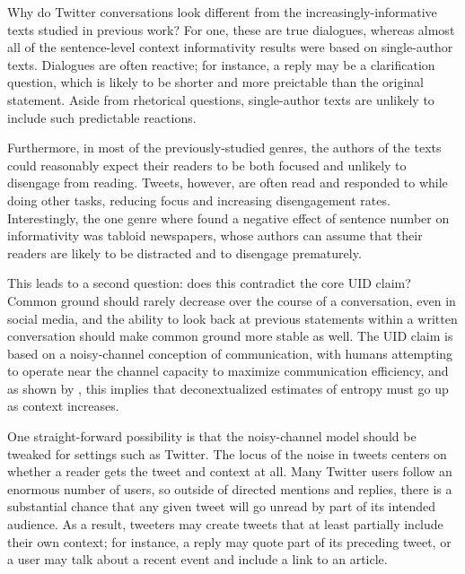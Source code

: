 \documentclass[11pt,letterpaper]{article}
\begin{document}
Why do Twitter conversations look different from the increasingly-informative texts studied in previous work? For one, these are true dialogues, whereas almost all of the sentence-level context informativity results were based on single-author texts.  Dialogues are often reactive; for instance, a reply may be a clarification question, which is likely to be shorter and more preictable than the original statement. Aside from rhetorical questions, single-author texts are unlikely to include such predictable reactions.

Furthermore, in most of the previously-studied genres, the authors of the texts could reasonably expect their readers to be both focused and unlikely to disengage from reading. Tweets, however, are often read and responded to while doing other tasks, reducing focus and increasing disengagement rates.  Interestingly, the one genre where  found a negative effect of sentence number on informativity was tabloid newspapers, whose authors can assume that their readers are likely to be distracted and to disengage prematurely.

This leads to a second question: does this contradict the core UID claim?  Common ground should rarely decrease over the course of a conversation, even in social media, and the ability to look back at previous statements within a written conversation should make common ground more stable as well.  The UID claim is based on a noisy-channel conception of communication, with humans attempting to operate near the channel capacity to maximize communication efficiency, and as shown by , this implies that deconextualized estimates of entropy must go up as context increases.

One straight-forward possibility is that the noisy-channel model should be tweaked for settings such as Twitter.  The locus of the noise in tweets centers on whether a reader gets the tweet and context at all.  Many Twitter users follow an enormous number of users, so outside of directed mentions and replies, there is a substantial chance that any given tweet will go unread by part of its intended audience. As a result, tweeters may create tweets that at least partially include their own context; for instance, a reply may quote part of its preceding tweet, or a user may talk about a recent event and include a link to an article.
\end{document}
